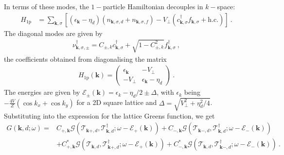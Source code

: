 \documentclass[%
reprint,
superscriptaddress,
groupedaddress,
superscriptaddress,
onecolumn,
10pt
]{revtex4-2}
\begin{document}
In terms of these modes, the \(1-\)particle Hamiltonian decouples in \(k-\)space:
\begin{equation}\begin{aligned}
	H_\text{1p} &= \sum_{\bm k,\sigma}\left[(\epsilon_{\bm k} - \eta_d) (n_{\bm k,\sigma, d} + n_{\bm k,\sigma, f}) - V_\perp(c^\dagger_{\bm k,\sigma}f_{\bm k,\sigma} + \text{h.c.})\right]~.
\end{aligned}\end{equation}
The diagonal modes are given by
\begin{equation}\begin{aligned}
	\nu^\dagger_{\bm k,\sigma,\pm} = C_{\pm,k} c^\dagger_{\bm k,\sigma} + \sqrt{1 - C_{\pm,k}^2}f^\dagger_{\bm k,\sigma}~,
\end{aligned}\end{equation}
the coefficients obtained from diagonalising the matrix
\begin{equation}\begin{aligned}
	H_\text{1p}(\bm k) = \begin{pmatrix} \epsilon_{\bm k}  & -V_\perp\\ -V_\perp & \epsilon_{\bm k} - \eta_d \end{pmatrix}~.
\end{aligned}\end{equation}
The energies are given by \(\mathcal{E}_\pm(\bm k) = \epsilon_k -\eta_d/2 \pm \Delta\), with \(\epsilon_k\) being \(-\frac{4V}{Z}(\cos k_x + \cos k_y)\) for a 2D square lattice and \(\Delta = \sqrt{V_\perp^2 + \eta_d^2/4}\).
Substituting into the expression for the lattice Greens function, we get
\begin{equation}\begin{aligned}
	G(\bm k,d;\omega) =& C_{+, \bm k}\mathcal{G}(\mathcal{T}_{\bm k+,d}, \mathcal{T}^\dagger_{\bm k,d}; \omega - \mathcal{E}_+(\bm k)) + C_{-, \bm k}\mathcal{G}(\mathcal{T}_{\bm k-,d}, \mathcal{T}^\dagger_{\bm k,d}; \omega - \mathcal{E}_-(\bm k))\\
					   &+ C^*_{+, \bm k}\mathcal{G}(\mathcal{T}_{\bm k,d}, \mathcal{T}^\dagger_{\bm k+,d}; \omega - \mathcal{E}_+(\bm k)) + C^*_{-, \bm k}\mathcal{G}(\mathcal{T}_{\bm k,d}, \mathcal{T}^\dagger_{\bm k-,d}; \omega - \mathcal{E}_-(\bm k))	~.
\end{aligned}\end{equation}
\end{document}
